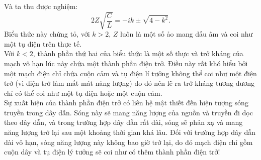 \begin{loigiai}
Và ta thu được nghiệm:
$$2Z\sqrt{\dfrac{C}{L}}=-ik\pm \sqrt{4-k^2}.$$
Biểu thức này chứng tỏ, với $k>2$, $Z$ luôn là một số ảo mang dấu âm và coi như một tụ điện trên thực tế.\\
Với $k<2$, thành phần thứ hai của biểu thức là một số thực và trở kháng của mạch vô hạn lúc này chứa một thành phần điện trở. Điều này rất khó hiểu bởi một mạch điện chỉ chứa cuộn cảm và tụ điện lí tưởng không thể coi như một điện trở (vì điện trở làm mất mát năng lượng) do đó nên lẽ ra trở kháng tương đương chỉ có thể coi như một tụ điện hoặc một cuộn cảm.\\
Sự xuất hiện của thành phần điện trở có liên hệ mật thiết đến hiện tượng sóng truyền trong dây dẫn. Sóng này sẽ mang năng lượng của nguồn và truyền đi dọc theo dây dẫn, và trong trường hợp dây dẫn rất dài, sóng sẽ phản xạ và mang năng lượng trở lại sau một khoảng thời gian khá lâu. Đối với trường hợp dây dẫn dài vô hạn, sóng năng lượng này không bao giờ trở lại, do đó mạch điện chỉ gồm cuộn dây và tụ điện lý tưởng sẽ coi như có thêm thành phần điện trở!
\end{loigiai}


